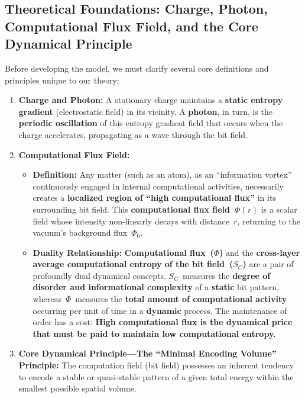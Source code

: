 \documentclass[11pt, a4paper]{article}
\begin{document}
\subsection{Theoretical Foundations: Charge, Photon, Computational Flux Field, and the Core Dynamical Principle}

Before developing the model, we must clarify several core definitions and principles unique to our theory:

\begin{enumerate}
    \item \textbf{Charge and Photon:} A stationary charge maintains a \textbf{static entropy gradient} (electrostatic field) in its vicinity. A \textbf{photon}, in turn, is the \textbf{periodic oscillation} of this entropy gradient field that occurs when the charge accelerates, propagating as a wave through the bit field.

    \item \textbf{Computational Flux Field:}
    \begin{itemize}
        \item \textbf{Definition:} Any matter (such as an atom), as an ``information vortex'' continuously engaged in internal computational activities, necessarily creates a \textbf{localized region of ``high computational flux''} in its surrounding bit field. This \textbf{computational flux field~$\Phi(r)$} is a scalar field whose intensity non-linearly decays with distance~$r$, returning to the vacuum's background flux~$\Phi_0$.
        \item \textbf{Duality Relationship:} \textbf{Computational flux~($\Phi$)} and the \textbf{cross-layer average computational entropy of the bit field~($S_C$)} are a pair of profoundly dual dynamical concepts. $S_C$~measures the \textbf{degree of disorder and informational complexity} of a \textbf{static} bit pattern, whereas~$\Phi$~measures the \textbf{total amount of computational activity} occurring per unit of time in a \textbf{dynamic} process. The maintenance of order has a cost: \textbf{High computational flux is the dynamical price that must be paid to maintain low computational entropy.}
    \end{itemize}

    \item \textbf{Core Dynamical Principle---The ``Minimal Encoding Volume'' Principle:} The computation field (bit field) possesses an inherent tendency to encode a stable or quasi-stable pattern of a given total energy within the smallest possible spatial volume.
\end{enumerate}
\end{document}
